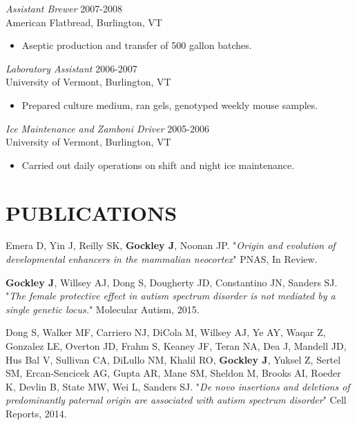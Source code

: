 \documentclass[margin, 10pt]{res} %
\begin{document}
\begin{resume}
{\sl Assistant Brewer} \hfill 2007-2008 \\
American Flatbread, Burlington, VT
\begin{itemize}
\item Aseptic production and transfer of 500 gallon batches. 
\end{itemize} 


{\sl Laboratory Assistant} \hfill 2006-2007 \\
University of Vermont, Burlington, VT
\begin{itemize}
\item Prepared culture medium, ran gels, genotyped weekly mouse samples. 
\end{itemize} 

{\sl Ice Maintenance and Zamboni Driver} \hfill 2005-2006 \\
University of Vermont, Burlington, VT
\begin{itemize}
\item Carried out daily operations on shift and night ice maintenance. 
\end{itemize} 


\section{PUBLICATIONS} 
Emera D, Yin J, Reilly SK, \textbf{Gockley J}, Noonan JP. "{\sl Origin and evolution of developmental enhancers in
the mammalian neocortex}" PNAS, In Review.

\textbf{Gockley J}, Willsey AJ, Dong S, Dougherty JD, Constantino JN, Sanders SJ. "{\sl The female protective effect in autism spectrum disorder is not mediated by a single genetic locus.}" Molecular Autism, 2015.

Dong S, Walker MF, Carriero NJ, DiCola M, Willsey AJ, Ye AY, Waqar Z, Gonzalez LE, Overton JD, Frahm S, Keaney JF, Teran NA, Dea J, Mandell JD, Hus Bal V, Sullivan CA, DiLullo NM, Khalil RO, \textbf{Gockley J}, Yuksel Z, Sertel SM, Ercan-Sencicek AG, Gupta AR, Mane SM, Sheldon M, Brooks AI, Roeder K, Devlin B, State MW, Wei L, Sanders SJ. "{\sl De novo insertions and deletions of predominantly paternal origin are associated with autism spectrum disorder}" Cell Reports, 2014.


\end{resume}
\end{document}
